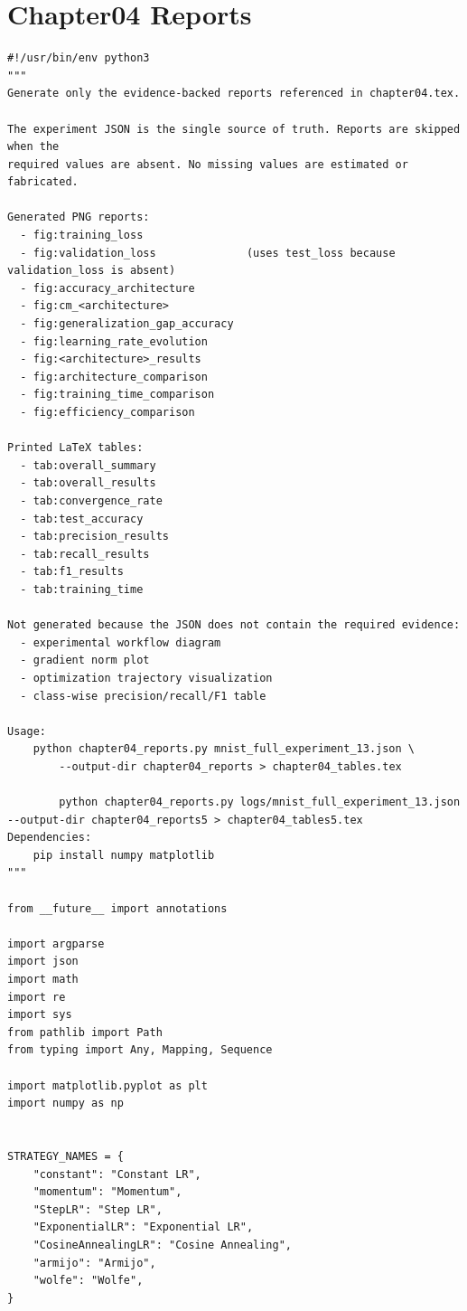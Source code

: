 \chapter{Chapter04 Reports}
\label{appendix:chapter04_reports}

\begin{verbatim}
#!/usr/bin/env python3
"""
Generate only the evidence-backed reports referenced in chapter04.tex.

The experiment JSON is the single source of truth. Reports are skipped when the
required values are absent. No missing values are estimated or fabricated.

Generated PNG reports:
  - fig:training_loss
  - fig:validation_loss              (uses test_loss because validation_loss is absent)
  - fig:accuracy_architecture
  - fig:cm_<architecture>
  - fig:generalization_gap_accuracy
  - fig:learning_rate_evolution
  - fig:<architecture>_results
  - fig:architecture_comparison
  - fig:training_time_comparison
  - fig:efficiency_comparison

Printed LaTeX tables:
  - tab:overall_summary
  - tab:overall_results
  - tab:convergence_rate
  - tab:test_accuracy
  - tab:precision_results
  - tab:recall_results
  - tab:f1_results
  - tab:training_time

Not generated because the JSON does not contain the required evidence:
  - experimental workflow diagram
  - gradient norm plot
  - optimization trajectory visualization
  - class-wise precision/recall/F1 table

Usage:
    python chapter04_reports.py mnist_full_experiment_13.json \
        --output-dir chapter04_reports > chapter04_tables.tex

        python chapter04_reports.py logs/mnist_full_experiment_13.json  --output-dir chapter04_reports5 > chapter04_tables5.tex
Dependencies:
    pip install numpy matplotlib
"""

from __future__ import annotations

import argparse
import json
import math
import re
import sys
from pathlib import Path
from typing import Any, Mapping, Sequence

import matplotlib.pyplot as plt
import numpy as np


STRATEGY_NAMES = {
    "constant": "Constant LR",
    "momentum": "Momentum",
    "StepLR": "Step LR",
    "ExponentialLR": "Exponential LR",
    "CosineAnnealingLR": "Cosine Annealing",
    "armijo": "Armijo",
    "wolfe": "Wolfe",
}


\end{verbatim}
